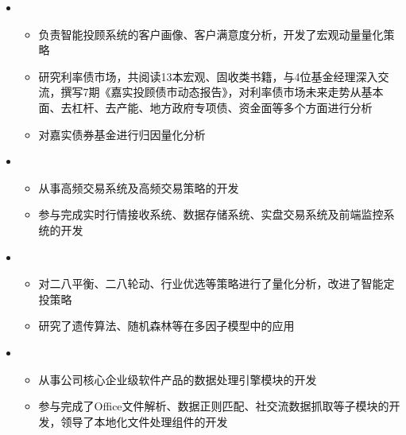   \begin{itemize}[leftmargin=*]
    \item
      {\small
      \begin{itemize}
        \item 负责智能投顾系统的客户画像、客户满意度分析，开发了宏观动量量化策略
        \item 研究利率债市场，共阅读13本宏观、固收类书籍，与4位基金经理深入交流，撰写7期《嘉实投顾债市动态报告》，对利率债市场未来走势从基本面、去杠杆、去产能、地方政府专项债、资金面等多个方面进行分析
        \item 对嘉实债券基金进行归因量化分析
      \end{itemize}
      }
    \item
      {\small
      \begin{itemize}
        \item 从事高频交易系统及高频交易策略的开发
        \item 参与完成实时行情接收系统、数据存储系统、实盘交易系统及前端监控系统的开发
      \end{itemize}
      }
    \item
      {\small
      \begin{itemize}
        \item 对二八平衡、二八轮动、行业优选等策略进行了量化分析，改进了智能定投策略
        \item 研究了遗传算法、随机森林等在多因子模型中的应用
      \end{itemize}
      }
    \item
      {\small
      \begin{itemize}
        \item 从事公司核心企业级软件产品的数据处理引擎模块的开发
        \item 参与完成了Office文件解析、数据正则匹配、社交流数据抓取等子模块的开发，领导了本地化文件处理组件的开发
      \end{itemize}
      }
  \end{itemize}